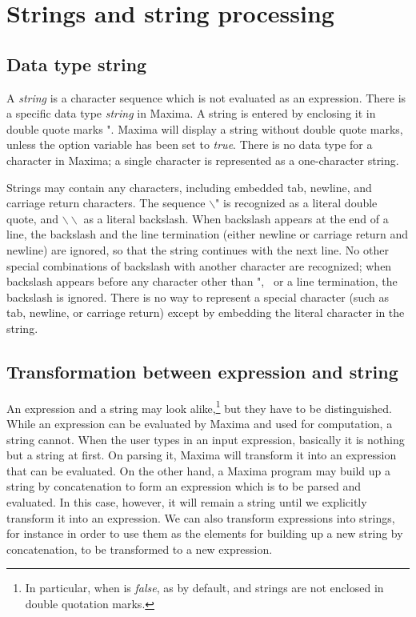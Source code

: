 \documentclass[../Maxima_Workbook.tex]{subfiles}
\begin{document}
	
\chapter{Strings and string processing}

\section{Data type string}\label{S1}

\lz {} \hfill {}

\lz A \emph{string} is a character sequence which is not evaluated as an expression. There is a specific data type \emph{string} in Maxima. A string is entered by enclosing it in double quote marks ". Maxima will display a string without double quote marks, unless the option variable  has been set to \emph{true}. There is no data type for a character in Maxima; a single character is represented as a one-character
string.

\lz Strings may contain any characters, including embedded tab, newline, and carriage return characters. The sequence $\backslash$" is recognized as a literal double quote, and $\backslash \backslash$ as a literal backslash. When backslash appears at the end of a line, the backslash and the line termination (either newline or carriage return and newline) are ignored, so that the string continues with the next line. No other special combinations of backslash with another character are recognized; when backslash appears before any character other than ", \, or a line termination, the backslash is ignored. There is no way to represent a special character (such as tab, newline, or carriage return) except by embedding the literal character in the string.

\section{Transformation between expression and string}

An expression and a string may look alike,\footnote{In particular, when  is \emph{false}, as by default, and strings are not enclosed in double quotation marks.} but they have to be distinguished. While an expression can be evaluated by Maxima and used for computation, a string cannot. When the user types in an input expression, basically it is nothing but a string at first. On parsing it, Maxima will transform it into an expression that can be evaluated. On the other hand, a Maxima program may build up a string by concatenation to form an expression which is to be parsed and evaluated. In this case, however, it will remain a string until we explicitly transform it into an expression. We can also transform expressions into strings, for instance in order to use them as the elements for building up a new string by concatenation,  to be transformed to a new expression.
\end{document}
